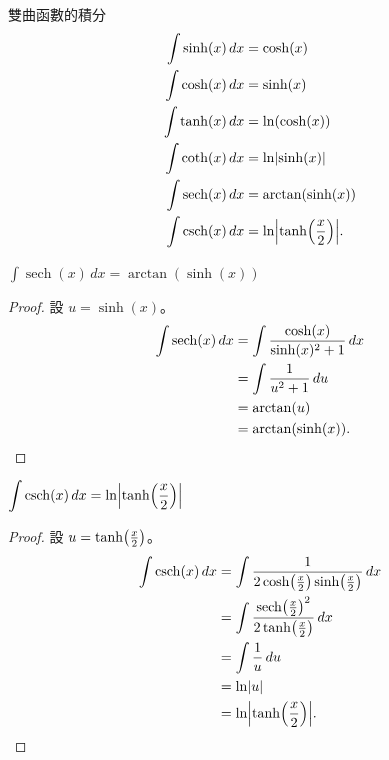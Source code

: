 \documentclass{beamer}
\newcommand{\Left} {\mathopen{}\mathclose\bgroup\left}
\newcommand{\Right}{\aftergroup\egroup\right}
\newcommand{\sech}  {\operatorname{sech}}
\newcommand{\csch}  {\operatorname{csch}}
\theoremstyle{remark}
\begin{document}
\begin{CJK}{UTF8}{bsmi}
\begin{frame}{雙曲函數的積分}
  \begin{align*}
    \int \sinh(x)\,dx &= \cosh(x)\\
    \int \cosh(x)\,dx &= \sinh(x)\\
    \int \tanh(x)\,dx &= \ln(\cosh(x))\\
    \int \coth(x)\,dx &= \ln \Left| \sinh(x) \Right|\\
    \int \sech(x)\,dx &= \arctan(\sinh(x))\\
    \int \csch(x)\,dx &= \ln \Left| \tanh \Left( \frac x 2 \Right) \Right|.
  \end{align*}
\end{frame}

\begin{frame}{$\displaystyle \int \sech(x)\,dx = \arctan(\sinh(x))$}
  \begin{proof}
    設 $u = \sinh(x)$。
    \begin{align*}
      \int \sech(x)\,dx &= \int \frac{\cosh(x)}{\sinh(x)^2 + 1}\,dx\\
	&= \int \frac{1}{u^2 + 1}\,du\\
	&= \arctan(u)\\
	&= \arctan(\sinh(x)). \qedhere
    \end{align*}
  \end{proof}
\end{frame}

\begin{frame}{$\displaystyle \int \csch(x)\,dx = \ln \Left| \tanh \Left( \frac x 2 \Right) \Right|$}
  \begin{proof}
    設 $u = \tanh \Left( \frac x 2 \Right)$。
    \begin{align*}
      \int \csch(x)\,dx &= \int \frac{1}{2 \cosh \Left( \frac x 2 \Right) \sinh \Left( \frac x 2 \Right)}\,dx\\
	&= \int \frac{\sech \Left( \frac x 2 \Right)^2}{2 \tanh \Left( \frac x 2 \Right)}\,dx\\
	&= \int \frac{1}{u}\,du\\
	&= \ln \Left| u \Right|\\
	&= \ln \Left| \tanh \Left( \frac x 2 \Right) \Right|. \qedhere
    \end{align*}
  \end{proof}
\end{frame}


\end{CJK}
\end{document}

